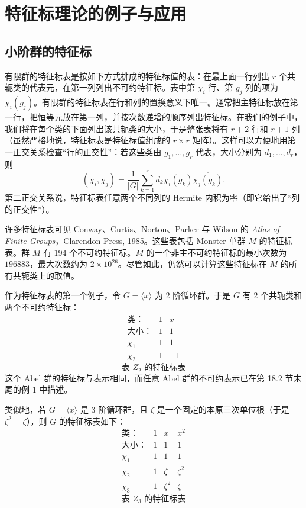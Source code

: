 
\providecommand{\Ind}{\operatorname{Ind}}
\chapter{特征标理论的例子与应用}

\section{小阶群的特征标}

有限群的特征标表是按如下方式排成的特征标值的表：在最上面一行列出 $r$ 个共轭类的代表元，在第一列列出不可约特征标。表中第 $\chi_i$ 行、第 $g_j$ 列的项为 $\chi_i(g_j)$。有限群的特征标表在行和列的置换意义下唯一。通常把主特征标放在第一行，把恒等元放在第一列，并按次数递增的顺序列出特征标。在我们的例子中，我们将在每个类的下面列出该共轭类的大小，于是整张表将有 $r+2$ 行和 $r+1$ 列（虽然严格地说，特征标表是特征标值组成的 $r\times r$ 矩阵）。这样可以方便地用第一正交关系检查“行的正交性”：若这些类由 $g_1,\ldots,g_r$ 代表，大小分别为 $d_1,\ldots,d_r$，则
\[
  (\chi_i,\chi_j)=\frac{1}{|G|}\sum_{k=1}^r d_k\chi_i(g_k)\overline{\chi_j(g_k)}.
\]
第二正交关系说，特征标表任意两个不同列的 Hermite 内积为零（即它给出了“列的正交性”）。

许多特征标表可见 Conway、Curtis、Norton、Parker 与 Wilson 的 \emph{Atlas of Finite Groups}，Clarendon Press, 1985。这些表包括 Monster 单群 $M$ 的特征标表。群 $M$ 有 $194$ 个不可约特征标。$M$ 的一个非主不可约特征标的最小次数为 $196883$，最大次数约为 $2\times 10^{26}$。尽管如此，仍然可以计算这些特征标在 $M$ 的所有共轭类上的取值。

作为特征标表的第一个例子，令 $G=\langle x\rangle$ 为 $2$ 阶循环群。于是 $G$ 有 $2$ 个共轭类和两个不可约特征标：
\[
\begin{array}{c|cc}
\text{类：} & 1 & x\\
\text{大小：} & 1 & 1\\\hline
\chi_1 & 1 & 1\\
\chi_2 & 1 & -1
\end{array}
\]
\[
\text{表 }Z_2\text{ 的特征标表}
\]
这个 Abel 群的特征标与表示相同，而任意 Abel 群的不可约表示已在第 18.2 节末尾的例 1 中描述。

类似地，若 $G=\langle x\rangle$ 是 $3$ 阶循环群，且 $\zeta$ 是一个固定的本原三次单位根（于是 $\zeta^2=\overline{\zeta}$），则 $G$ 的特征标表如下：
\[
\begin{array}{c|ccc}
\text{类：} & 1 & x & x^2\\
\text{大小：} & 1 & 1 & 1\\\hline
\chi_1 & 1 & 1 & 1\\
\chi_2 & 1 & \zeta & \zeta^2\\
\chi_3 & 1 & \zeta^2 & \zeta
\end{array}
\]
\[
\text{表 }Z_3\text{ 的特征标表}
\]

